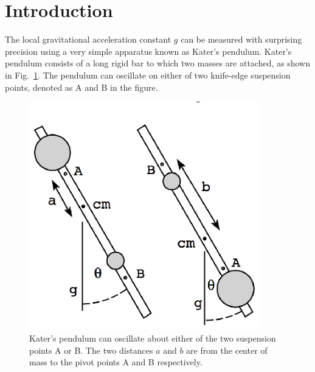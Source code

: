 \documentclass{revtex4}
\begin{document}
\section{Introduction}
\label{sec:introduction}

The local gravitational acceleration constant $g$ can be measured with
surprising precision using a very simple apparatus known as
Kater's pendulum\cite{Symon71,Kleppner73,Marion95}.
Kater's pendulum consists of
a long rigid bar to which two masses are attached, as shown in
Fig.~\ref{katersfig}.  The pendulum can oscillate on either of two
knife-edge suspension points, denoted as A and B in the figure.

\begin{figure}
\includegraphics[width=10cm]{katersfig.eps}
\caption{\label{katersfig} 
Kater's pendulum can oscillate about either of the two suspension points
A or B. The two distances $a$ and $b$ are from the center of mass
to the pivot points A and B respectively.}
\end{figure}
\end{document}
